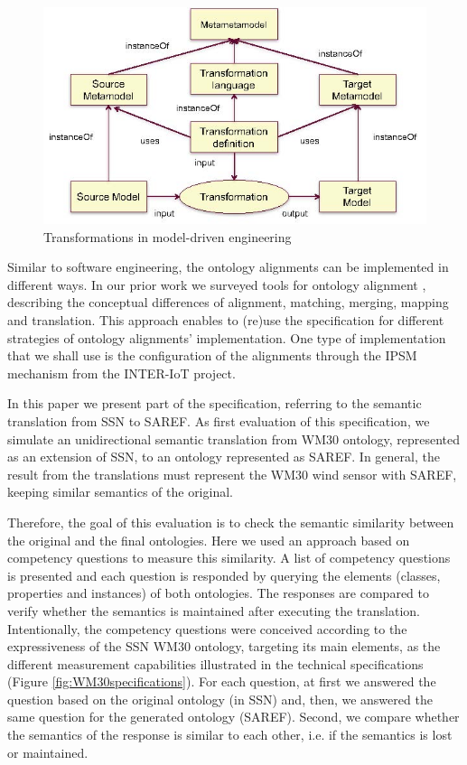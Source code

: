 \documentclass{sig-alternate-05-2015}
\begin{document}
\begin{figure}[h!]
\centering
\includegraphics[scale=0.39]{PastedGraphic-1}
\caption{Transformations in model-driven engineering}
\label{fig:PastedGraphic-1}
\end{figure}

Similar to software engineering, the ontology alignments can be implemented in different ways. In our prior work we surveyed tools for ontology alignment \cite{Ganzha2015}, describing the conceptual differences of alignment, matching, merging, mapping and translation. This approach enables to (re)use the specification for different strategies of ontology alignments’ implementation. One type of implementation that we shall use is the configuration of the alignments through the IPSM mechanism from the INTER-IoT project. 

In this paper we present part of the specification, referring to the semantic translation from SSN to SAREF. As first evaluation of this specification, we simulate an unidirectional semantic translation from WM30 ontology, represented as an extension of SSN, to an ontology represented as SAREF. In general, the result from the translations must represent the WM30 wind sensor with SAREF, keeping similar semantics of the original. 

Therefore, the goal of this evaluation is to check the semantic similarity between the original and the final ontologies. Here we used an approach based on competency questions to measure this similarity. A list of competency questions is presented and each question is responded by querying the elements (classes, properties and instances) of both ontologies. The responses are compared to verify whether the semantics is maintained after executing the translation. Intentionally, the competency questions were conceived according to the expressiveness of the SSN WM30 ontology, targeting its main elements, as the different measurement capabilities illustrated in the technical specifications (Figure \ref{fig:WM30specifications}). For each question, at first we answered the question based on the original ontology (in SSN) and, then, we answered the same question for the generated ontology (SAREF). Second, we compare whether the semantics of the response is similar to each other, i.e. if the semantics is lost or maintained. 
\end{document}
